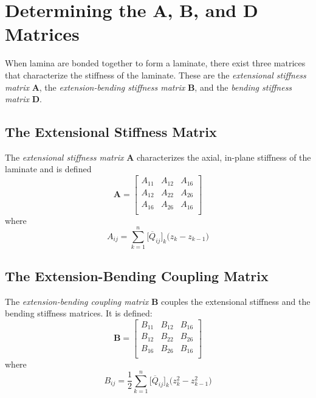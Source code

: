\documentclass{article}
\begin{document}
\section{Determining the $\bm{A}$, $\bm{B}$, and $\bm{D}$ Matrices}
When lamina are bonded together to form a laminate, there exist three matrices that characterize the stiffness of the laminate. These are the \emph{extensional stiffness matrix} $\bm{A}$, the \emph{extension-bending stiffness matrix} $\bm{B}$, and the \emph{bending stiffness matrix} $\bm{D}$.
  \subsection{The Extensional Stiffness Matrix}
  The \emph{extensional stiffness matrix} $\bm{A}$ characterizes the axial, in-plane stiffness of the laminate and is defined
  \begin{equation}
    \bm{A} = \left[ \begin{array}{ccc}
               A_{11} & A_{12} & A_{16} \\
               A_{12} & A_{22} & A_{26} \\
               A_{16} & A_{26} & A_{16} \\
             \end{array} \right]
  \end{equation}
  where
  \begin{equation}
    A_{ij} = \sum_{k=1}^{n}\big[\overline{Q}_{ij}\big]_{k}\big(z_{k} - z_{k-1}\big)
  \end{equation}

  \subsection{The Extension-Bending Coupling Matrix}
  The \emph{extension-bending coupling matrix} $\bm{B}$ couples the extensional stiffness and the bending stiffness matrices. It is defined:
  \begin{equation}
    \bm{B} = \left[ \begin{array}{ccc}
               B_{11} & B_{12} & B_{16} \\
               B_{12} & B_{22} & B_{26} \\
               B_{16} & B_{26} & B_{16} \\
             \end{array} \right]
  \end{equation}
  where
  \begin{equation}
    B_{ij} = \frac{1}{2}\sum_{k=1}^{n}\big[\overline{Q}_{ij}\big]_{k}\big(z_{k}^{2} - z_{k-1}^{2}\big)
  \end{equation}
\end{document}
